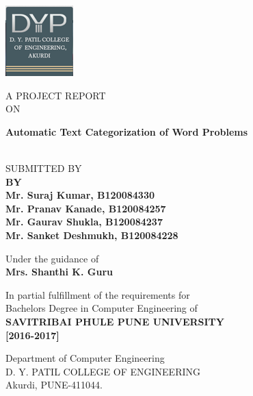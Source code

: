 \begin{center}
\pagestyle{empty}


\begin{center}


\includegraphics[scale=1]{newlogo} 	 
\vspace{0.3 in}

{\setlength{\baselineskip}{1.2 \baselineskip}

\normalsize  A  PROJECT REPORT \\
\normalsize ON

\fontsize{18}{25} \textbf{Automatic Text Categorization of Word Problems}
\\


	
\fontsize{16}{21}SUBMITTED BY\\
{\bfseries \fontsize{14}{12} \selectfont BY \\ 
\vspace*{1\baselineskip}} 
\textbf{
Mr. Suraj Kumar,	B120084330  \\
Mr. Pranav Kanade,	B120084257   \\
Mr. Gaurav Shukla,	B120084237  \\
Mr. Sanket Deshmukh,	B120084228\\}
\vspace*{2\baselineskip}


\fontsize{16}{21}Under the guidance of\\
\fontsize{12}{18}\textbf{Mrs. Shanthi K. Guru\\}


\fontsize{16}{21} In partial fulfillment of the requirements for\\ 
\fontsize{16}{21}Bachelors Degree in Computer Engineering of\\
\fontsize{12}{18}\textbf{SAVITRIBAI PHULE PUNE UNIVERSITY}\\
\fontsize{12}{18}\textbf{[2016-2017]}


\vspace{0.5in}
\fontsize{16}{21}Department of Computer Engineering\\
\fontsize{16}{21}D. Y. PATIL COLLEGE OF ENGINEERING\\
\fontsize{16}{21}Akurdi, PUNE-411044.\\
}
\end{center}

\end{center}


